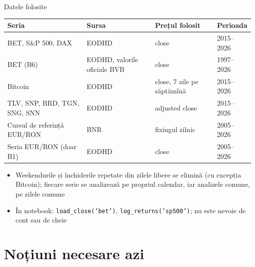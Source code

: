 \begin{frame}{Datele folosite}
\itemsize{\small}
\begin{center}
\footnotesize
\begin{tabular}{llll}
\toprule
\textbf{Seria} & \textbf{Sursa} & \textbf{Prețul folosit} & \textbf{Perioada} \\
\midrule
BET, S\&P 500, DAX & EODHD & close & 2015--2026 \\
BET (B6) & EODHD, valorile oficiale BVB & close & 1997--2026 \\
Bitcoin & EODHD & close, 7 zile pe săptămînă & 2015--2026 \\
TLV, SNP, BRD, TGN, SNG, SNN & EODHD & adjusted close & 2015--2026 \\
Cursul de referință EUR/RON & BNR & fixingul zilnic & 2005--2026 \\
Seria EUR/RON (doar B1) & EODHD & close & 2005--2026 \\
\bottomrule
\end{tabular}
\end{center}
\begin{itemize}
    \item Weekendurile și închiderile repetate din zilele libere se elimină (cu excepția Bitcoin); fiecare serie se analizează pe propriul calendar, iar analizele comune, pe zilele comune
    \item În notebook: \texttt{load\_close('bet')}, \texttt{log\_returns('sp500')}; nu este nevoie de cont sau de cheie
\end{itemize}
\end{frame}


\section{Noțiuni necesare azi}

